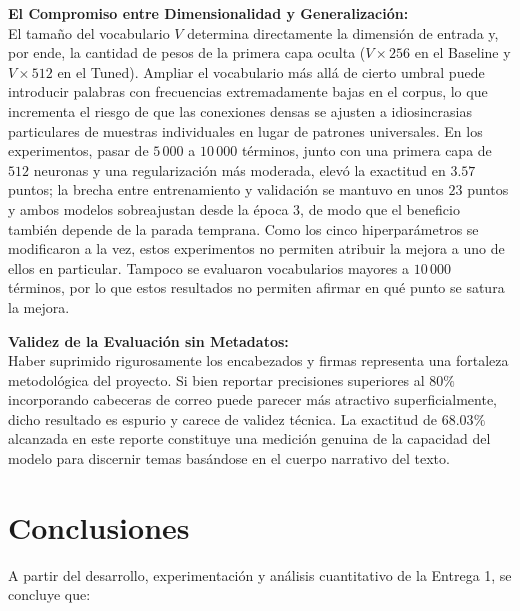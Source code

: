 \documentclass[12pt, a4paper]{article}
\begin{document}
\textbf{El Compromiso entre Dimensionalidad y Generalización:} \\
El tamaño del vocabulario $V$ determina directamente la dimensión de entrada y, por ende, la cantidad de pesos de la primera capa oculta ($V \times 256$ en el Baseline y $V \times 512$ en el Tuned). Ampliar el vocabulario más allá de cierto umbral puede introducir palabras con frecuencias extremadamente bajas en el corpus, lo que incrementa el riesgo de que las conexiones densas se ajusten a idiosincrasias particulares de muestras individuales en lugar de patrones universales. En los experimentos, pasar de $5\,000$ a $10\,000$ términos, junto con una primera capa de $512$ neuronas y una regularización más moderada, elevó la exactitud en $3.57$ puntos; la brecha entre entrenamiento y validación se mantuvo en unos $23$ puntos y ambos modelos sobreajustan desde la época $3$, de modo que el beneficio también depende de la parada temprana. Como los cinco hiperparámetros se modificaron a la vez, estos experimentos no permiten atribuir la mejora a uno de ellos en particular. Tampoco se evaluaron vocabularios mayores a $10\,000$ términos, por lo que estos resultados no permiten afirmar en qué punto se satura la mejora.

\textbf{Validez de la Evaluación sin Metadatos:} \\
Haber suprimido rigurosamente los encabezados y firmas representa una fortaleza metodológica del proyecto. Si bien reportar precisiones superiores al $80\%$ incorporando cabeceras de correo puede parecer más atractivo superficialmente, dicho resultado es espurio y carece de validez técnica. La exactitud de $68.03\%$ alcanzada en este reporte constituye una medición genuina de la capacidad del modelo para discernir temas basándose en el cuerpo narrativo del texto.

\section{Conclusiones}

A partir del desarrollo, experimentación y análisis cuantitativo de la Entrega 1, se concluye que:
\end{document}
